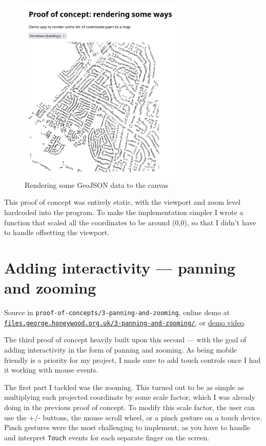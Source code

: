 \documentclass{final_report}
\begin{document}
\begin{figure}[ht]
    \centering
    \includegraphics[width=0.7\textwidth]{../proof-of-concepts/2-rendering-a-way/screenshots/ferndown-buildings.png}
    \caption{Rendering some GeoJSON data to the canvas}\label{fig:rendering-geometry}
\end{figure}

This proof of concept was entirely static, with the viewport and zoom level hardcoded into the program. To make the implementation simpler I wrote a function that scaled all the coordinates to be around (0,0), so that I didn't have to handle offsetting the viewport.

\section{Adding interactivity --- panning and zooming}

{ \footnotesize Source in \texttt{proof-of-concepts/3-panning-and-zooming}, online demo at \href{https://files.george.honeywood.org.uk/3-panning-and-zooming/}{\nolinkurl{files.george.honeywood.org.uk/3-panning-and-zooming/}}, or \href{https://youtu.be/_JvGwLra_Q4}{demo video}.}

The third proof of concept heavily built upon this second --- with the goal of adding interactivity in the form of panning and zooming. As being mobile friendly is a priority for my project, I made sure to add touch controls once I had it working with mouse events.

The first part I tackled was the zooming. This turned out to be as simple as multiplying each projected coordinate by some scale factor, which I was already doing in the previous proof of concept. To modify this scale factor, the user can use the +/- buttons, the mouse scroll wheel, or a pinch gesture on a touch device. Pinch gestures were the most challenging to implement, as you have to handle and interpret \texttt{Touch} events for each separate finger on the screen.
\end{document}
